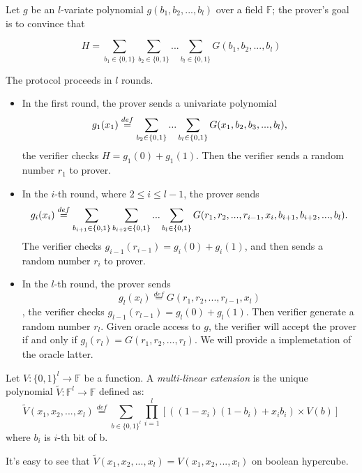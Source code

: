 \begin{definition}
	Let $g$ be an $l$-variate polynomial $g(b_1, b_2, ..., b_{l})$ over a field $\mathbb{F}$; the prover's goal is to convince that 

	$$H=\sum_{b_1\in\{0,1\}}\sum_{b_2\in\{0,1\}}...\sum_{b_{l}\in\{0,1\}}G(b_1,b_2,...,b_{l})$$
\end{definition}

\begin{protocol}
	The protocol proceeds in $l$ rounds. 
	\begin{itemize}
		\item In the first round, the prover sends a univariate polynomial $$g_1(x_1)\overset{def}{=}\sum_{b_2\in\{0,1\}}...\sum_{b_{l}\in\{0,1\}}G(x_1, b_2, b_3, ..., b_{l})\textnormal{,}$$ the verifier checks $H=g_1(0)+g_1(1)$. Then the verifier sends a random number $r_1$ to prover.
		\item In the $i$-th round, where $2\le i \le l-1$, the prover sends 
		$$g_{i}(x_{i})\overset{def}{=}\sum_{b_{i+1}\in\{0,1\}}\sum_{b_{i+2}\in\{0,1\}}...\sum_{b_{l}\in\{0,1\}}G(r_1, r_2, ..., r_{i-1}, x_{i}, b_{i+1}, b_{i+2}, ..., b_{l})\textnormal{.}$$ 
		The verifier checks $g_{i-1}(r_{i-1})=g_{i}(0)+g_{i}(1)$, and then sends a random number $r_{i}$ to prover.
		\item In the $l$-th round, the prover sends $$g_{l}(x_{l})\overset{def}{=}G(r_1, r_2, ..., r_{l-1}, x_{l})$$, the verifier checks $g_{l-1}(r_{l-1})=g_{l}(0)+g_{l}(1)$. Then verifier generate a random number $r_{l}$. Given oracle access to $g$, the verifier will accept the prover if and only if $g_{l}(r_l) = G(r_1, r_2, ..., r_l)$. We will provide a implemetation of the oracle latter. 
	\end{itemize}
\end{protocol}

\begin{definition}
	Let $V:\{0, 1\}^l \rightarrow \mathbb{F}$ be a function. A \textit{multi-linear extension} is the unique polynomial $\tilde{V}: \mathbb{F}^l \rightarrow \mathbb{F}$ defined as:
	$$\tilde{V}(x_1, x_2, ..., x_{l})\overset{def}{=}\sum_{b\in\{0,1\}^l}\prod_{i=1}^{l}[((1-x_i)(1-b_i)+x_ib_i) \times V(b)]$$
	where $b_i$ is $i$-th bit of b.

	It's easy to see that $\tilde{V}(x_1, x_2, ..., x_{l}) = V(x_1, x_2, ..., x_{l})$ on boolean hypercube.
\end{definition}



